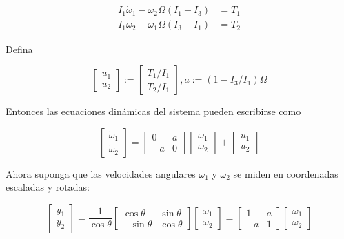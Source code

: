 $$
\begin{aligned}
I_{1} \dot{\omega}_{1}-\omega_{2} \Omega\left(I_{1}-I_{3}\right) & =T_{1} \\
I_{1} \dot{\omega}_{2}-\omega_{1} \Omega\left(I_{3}-I_{1}\right) & =T_{2}
\end{aligned}
$$


Defina

$$
\left[\begin{array}{l}
u_{1} \\
u_{2}
\end{array}\right]:=\left[\begin{array}{l}
T_{1} / I_{1} \\
T_{2} / I_{1}
\end{array}\right], a:=\left(1-I_{3} / I_{1}\right) \Omega
$$

Entonces las ecuaciones dinámicas del sistema pueden escribirse como

$$
\left[\begin{array}{c}
\dot{\omega}_{1} \\
\dot{\omega}_{2}
\end{array}\right]=\left[\begin{array}{cc}
0 & a \\
-a & 0
\end{array}\right]\left[\begin{array}{l}
\omega_{1} \\
\omega_{2}
\end{array}\right]+\left[\begin{array}{l}
u_{1} \\
u_{2}
\end{array}\right]
$$

Ahora suponga que las velocidades angulares $\omega_{1}$ y $\omega_{2}$ se miden en coordenadas escaladas y rotadas:

$$
\left[\begin{array}{l}
y_{1} \\
y_{2}
\end{array}\right]=\frac{1}{\cos \theta}\left[\begin{array}{cc}
\cos \theta & \sin \theta \\
-\sin \theta & \cos \theta
\end{array}\right]\left[\begin{array}{l}
\omega_{1} \\
\omega_{2}
\end{array}\right]=\left[\begin{array}{cc}
1 & a \\
-a & 1
\end{array}\right]\left[\begin{array}{l}
\omega_{1} \\
\omega_{2}
\end{array}\right]
$$

